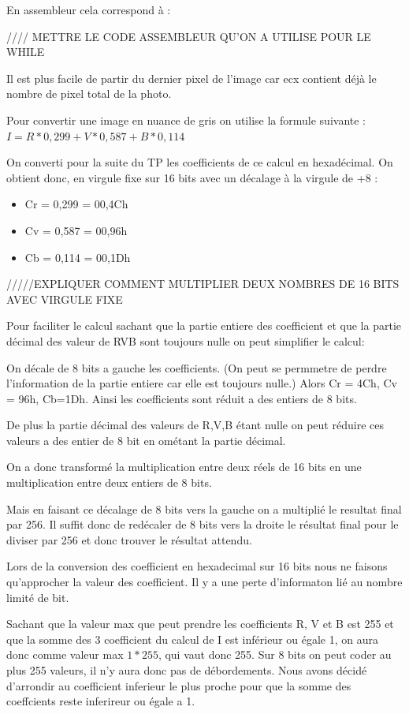\documentclass[11pt]{report}
\begin{document}
En assembleur cela correspond à :


//// METTRE LE CODE ASSEMBLEUR QU'ON A UTILISE POUR LE WHILE


Il est plus facile de partir du dernier pixel de l'image car ecx contient déjà le nombre de pixel total de la photo.

Pour convertir une image en nuance de gris on utilise la formule suivante :
$I=R*0,299+V*0,587+B*0,114$

On converti pour la suite du TP les coefficients de ce calcul en hexadécimal.
On obtient donc, en virgule fixe sur 16 bits avec un décalage à la virgule de +8 :
\begin{itemize}
\item  Cr = 0,299 =  00,4Ch
\item  Cv = 0,587 = 00,96h
\item  Cb = 0,114 = 00,1Dh
\end{itemize}

/////EXPLIQUER COMMENT MULTIPLIER DEUX NOMBRES DE 16 BITS AVEC VIRGULE FIXE

Pour faciliter le calcul sachant que la partie entiere des coefficient et que la partie décimal des valeur de RVB sont toujours nulle on peut simplifier le calcul:

On décale de 8 bits a gauche les coefficients. (On peut se permmetre de perdre l'information de la partie entiere car elle est toujours nulle.)
Alors Cr = 4Ch, Cv = 96h, Cb=1Dh.
Ainsi les coefficients sont réduit a des entiers de 8 bits.

De plus la partie décimal des valeurs de R,V,B étant nulle on peut réduire ces valeurs a des entier de 8 bit en ométant la partie décimal.

On a donc transformé la multiplication entre deux réels de 16 bits en une multiplication entre deux entiers de 8 bits.

Mais en faisant ce décalage de 8 bits vers la gauche on a multiplié le resultat final par 256.
Il suffit donc de redécaler de 8 bits vers la droite le résultat final pour le diviser par 256 et donc trouver le résultat attendu.


Lors de la conversion des coefficient en hexadecimal sur 16 bits nous ne faisons qu'approcher la valeur des coefficient. Il y a une perte d'informaton lié au nombre limité de bit.

Sachant que la valeur max que peut prendre les coefficients R, V et B est 255 et que la somme des 3 coefficient du calcul de I est inférieur ou égale 1, on aura donc comme valeur max $1*255$, qui vaut donc 255. Sur 8 bits on peut coder au plus 255 valeurs, il n'y aura donc pas de débordements.
Nous avons décidé d'arrondir au coefficient inferieur le plus proche pour que la somme des coeffcients reste inferireur ou égale a 1.
\end{document}
